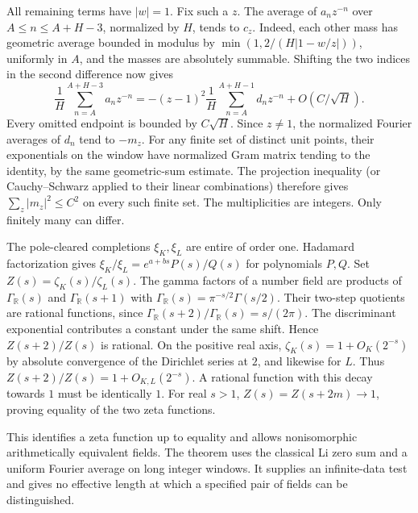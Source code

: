 All remaining terms have $|w|=1$. Fix such a $z$.
The average of $a_n z^{-n}$ over $A\le n\le A+H-3$, normalized
by $H$, tends to $c_z$. Indeed, each other mass has geometric
average bounded in modulus by $\min(1,2/(H|1-w/z|))$, uniformly
in $A$, and the masses are absolutely summable. Shifting the two
indices in the second difference now gives
\[
 \frac1H\sum_{n=A}^{A+H-3}a_nz^{-n}
 =-(z-1)^2\frac1H\sum_{n=A}^{A+H-1}d_nz^{-n}
       +O(C/\sqrt H).
\]
Every omitted endpoint is bounded by $C\sqrt H$. Since $z\ne1$,
the normalized Fourier averages of $d_n$ tend to $-m_z$.
For any finite set of distinct unit points, their exponentials on
the window have normalized Gram matrix tending to the identity, by
the same geometric-sum estimate. The projection inequality
(or Cauchy--Schwarz applied to their linear combinations) therefore
gives $\sum_z |m_z|^2\le C^2$ on every such finite set.
The multiplicities are integers. Only finitely many can differ.

The pole-cleared completions $\xi_K,\xi_L$ are entire of order one.
Hadamard factorization gives $\xi_K/\xi_L=e^{a+bs}P(s)/Q(s)$
for polynomials $P,Q$. Set $Z(s)=\zeta_K(s)/\zeta_L(s)$.
The gamma factors of a number field are products of
$\Gamma_{\mathbb R}(s)$ and $\Gamma_{\mathbb R}(s+1)$ with
$\Gamma_{\mathbb R}(s)=\pi^{-s/2}\Gamma(s/2)$. Their two-step
quotients are rational functions, since
$\Gamma_{\mathbb R}(s+2)/\Gamma_{\mathbb R}(s)=s/(2\pi)$.
The discriminant exponential contributes a constant under the same
shift. Hence $Z(s+2)/Z(s)$ is rational. On the positive real axis,
$\zeta_K(s)=1+O_K(2^{-s})$ by absolute convergence of the
Dirichlet series at $2$, and likewise for $L$. Thus
$Z(s+2)/Z(s)=1+O_{K,L}(2^{-s})$. A rational function with this
decay towards $1$ must be identically $1$. For real $s>1$,
$Z(s)=Z(s+2m)\to1$, proving equality of the two zeta functions.

This identifies a zeta function up to equality and allows nonisomorphic
arithmetically equivalent fields. The theorem uses the classical Li
zero sum and a uniform Fourier average on long integer windows.
It supplies an infinite-data test and gives no effective length at
which a specified pair of fields can be distinguished.
